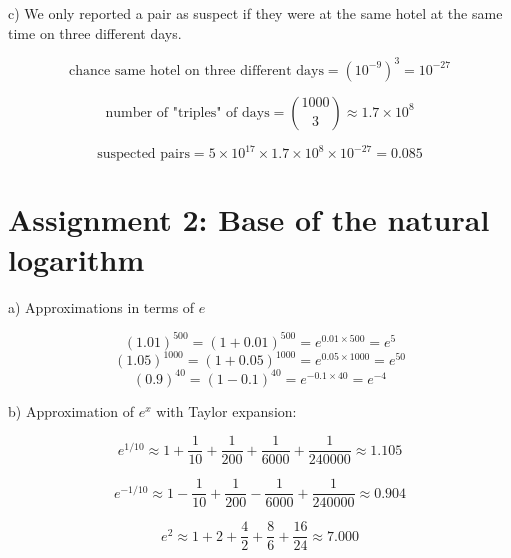 \documentclass[]{scrartcl}
\begin{document}
c) We only reported a pair as suspect if they were at the same hotel at the same time on three different days.
		
\[\text{chance same hotel on three different days} = (10^{-9})^3 = 10^{-27} \]

\[\text{number of "triples" of days} =  \binom{1000}{3} \approx 1.7 \times 10^8 \]

\[\text{suspected pairs} = 5 \times 10^{17} \times 1.7 \times 10^8 \times 10^{-27} = 0.085 \]

\section*{Assignment 2: Base of the natural logarithm}

a) Approximations in terms of $e$

\[(1.01)^{500} = (1 + 0.01)^{500} = e^{0.01 \times 500} = e^5 \]
\[(1.05)^{1000}    = (1 + 0.05)^{1000} = e^{0.05 \times 1000} = e^{50} \]
\[(0.9)^{40} = (1 - 0.1)^{40} = e^{-0.1 \times 40} = e^{-4} \]

	
b) Approximation of $e^x$ with Taylor expansion:
		
\[e^{1/10} \approx 1 + \frac{1}{10} + \frac{1}{200} + \frac{1}{6000} + \frac{1}{240000} \approx 1.105 \]
	
\[e^{-1/10} \approx 1 - \frac{1}{10} + \frac{1}{200} - \frac{1}{6000} + \frac{1}{240000} \approx 0.904 \]
	
\[e^2 \approx 1 + 2 + \frac{4}{2} + \frac{8}{6} + \frac{16}{24} \approx 7.000 \]
	
\end{document}

